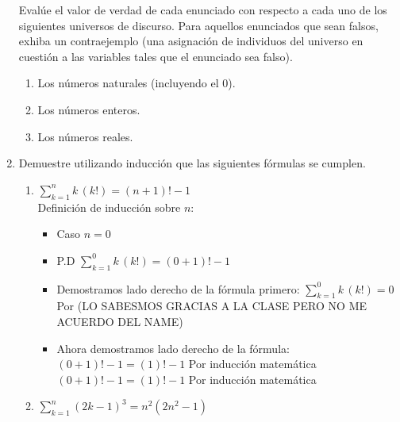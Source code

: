 \documentclass[a4paper,10pt]{article}
\begin{document}
\begin{enumerate}
  Eval\'ue el valor de verdad de cada enunciado con respecto a cada uno de los siguientes universos de discurso. Para aquellos enunciados que sean falsos, exhiba un contraejemplo (una asignaci\'on de individuos del universo en cuesti\'on a las variables tales que el enunciado sea falso).
  \begin{enumerate}
    \item Los n\'umeros naturales (incluyendo el 0).
    \item Los n\'umeros enteros.
    \item Los n\'umeros reales.
  \end{enumerate}
    
    \item {} Demuestre utilizando inducci\'on que las siguientes f\'ormulas se cumplen.			
	    \begin{enumerate}
			  \item $\sum\limits_{k=1}^n k\,(k!) = (n+1)!-1$\\
        Definición de inducción sobre $n$:
        \begin{itemize}
          \item Caso $n = 0$
          \item P.D $\sum\limits_{k=1}^0 k\,(k!) = (0+1)!-1$
          \item Demostramos lado derecho de la fórmula primero:
			    $\sum\limits_{k=1}^0 k\,(k!) = 0$ \hfill Por (LO SABESMOS GRACIAS A LA CLASE PERO NO ME ACUERDO DEL NAME)
          \item Ahora demostramos lado derecho de la fórmula:
			    $(0+1)!-1 = (1)!-1$ \hfill Por inducción matemática
			    $(0+1)!-1 = (1)!-1$ \hfill Por inducción matemática
      \end{itemize}
				\item $\sum\limits_{k=1}^n (2k - 1)^3 = n^2(2n^2 - 1)$				
			\end{enumerate}	

	\end{enumerate}	
\end{document}
